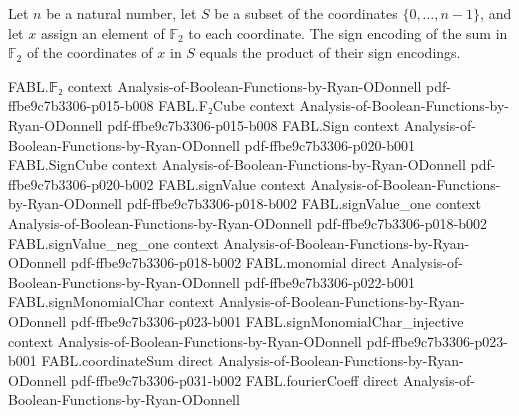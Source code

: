 \begin{theorem}
\label{FABL.signEncode_coordinateSum_local}
\leanok
{}
Let $n$ be a natural number, let $S$ be a subset of the coordinates
$\{0,\ldots,n-1\}$, and let $x$ assign an element of $\mathbb{F}_2$ to each
coordinate. The sign encoding of the sum in $\mathbb{F}_2$ of the coordinates of $x$ in
$S$ equals the product of their sign encodings.
\end{theorem}

\begin{theorem}
\label{FABL.binaryParitySign_transport_eq_parityFunction}
\leanok
{}
\proofstep
  {FABL.𝔽₂}
  {context}
  {Analysis-of-Boolean-Functions-by-Ryan-ODonnell}
  {pdf-ffbe9c7b3306-p015-b008}
\proofstep
  {FABL.F₂Cube}
  {context}
  {Analysis-of-Boolean-Functions-by-Ryan-ODonnell}
  {pdf-ffbe9c7b3306-p015-b008}
\proofstep
  {FABL.Sign}
  {context}
  {Analysis-of-Boolean-Functions-by-Ryan-ODonnell}
  {pdf-ffbe9c7b3306-p020-b001}
\proofstep
  {FABL.SignCube}
  {context}
  {Analysis-of-Boolean-Functions-by-Ryan-ODonnell}
  {pdf-ffbe9c7b3306-p020-b002}
\proofstep
  {FABL.signValue}
  {context}
  {Analysis-of-Boolean-Functions-by-Ryan-ODonnell}
  {pdf-ffbe9c7b3306-p018-b002}
\proofstep
  {FABL.signValue_one}
  {context}
  {Analysis-of-Boolean-Functions-by-Ryan-ODonnell}
  {pdf-ffbe9c7b3306-p018-b002}
\proofstep
  {FABL.signValue_neg_one}
  {context}
  {Analysis-of-Boolean-Functions-by-Ryan-ODonnell}
  {pdf-ffbe9c7b3306-p018-b002}
\proofstep
  {FABL.monomial}
  {direct}
  {Analysis-of-Boolean-Functions-by-Ryan-ODonnell}
  {pdf-ffbe9c7b3306-p022-b001}
\proofstep
  {FABL.signMonomialChar}
  {context}
  {Analysis-of-Boolean-Functions-by-Ryan-ODonnell}
  {pdf-ffbe9c7b3306-p023-b001}
\proofstep
  {FABL.signMonomialChar_injective}
  {context}
  {Analysis-of-Boolean-Functions-by-Ryan-ODonnell}
  {pdf-ffbe9c7b3306-p023-b001}
\proofstep
  {FABL.coordinateSum}
  {direct}
  {Analysis-of-Boolean-Functions-by-Ryan-ODonnell}
  {pdf-ffbe9c7b3306-p031-b002}
\proofstep
  {FABL.fourierCoeff}
  {direct}
  {Analysis-of-Boolean-Functions-by-Ryan-ODonnell}

\end{theorem}
